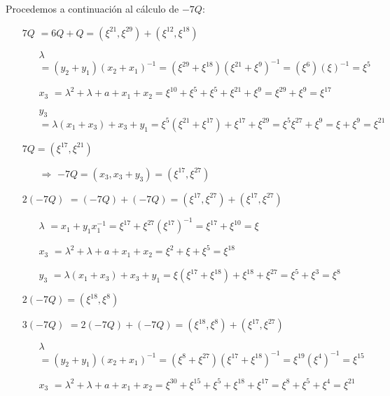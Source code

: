 \documentclass[fleqn]{article}
\begin{document}
    Procedemos a continuación al cálculo de $-7Q$:

    \begin{itemize}
        \item[$7Q$] $ = 6Q + Q = (\xi^{21}, \xi^{29}) + (\xi^{12}, \xi^{18})$
            \begin{itemize}
                \item[$\lambda$] $ = (y_2 + y_1)(x_2 + x_1)^{-1} = (\xi^{29} + \xi^{18})(\xi^{21} + \xi^{9})^{-1} = (\xi^{6})(\xi)^{-1} = \xi^{5}$
                \item[$x_3$] $ = \lambda^2 + \lambda + a + x_1 + x_2 = \xi^{10} + \xi^{5} + \xi^{5} + \xi^{21} + \xi^{9} = \xi^{29} + \xi^{9} = \xi^{17}$
                \item[$y_3$] $ = \lambda(x_1 + x_3) + x_3 + y_1 = \xi^{5} (\xi^{21} + \xi^{17}) + \xi^{17} + \xi^{29} = \xi^{5} \xi^{27} + \xi^{9} = \xi + \xi^{9} = \xi^{21}$
            \end{itemize}
            $7Q = (\xi^{17}, \xi^{21})$
            \begin{itemize}
                \item[$\Rightarrow$] $-7Q = (x_3, x_3 + y_3) = (\xi^{17}, \xi^{27})$
            \end{itemize}
        \item[$2(-7Q)$] $ = (-7Q) + (-7Q) = (\xi^{17}, \xi^{27}) + (\xi^{17}, \xi^{27})$
            \begin{itemize}
                \item[$\lambda$] $ = x_1 + y_1x_1^{-1} = \xi^{17} + \xi^{27} (\xi^{17})^{-1} = \xi^{17} + \xi^{10} = \xi$
                \item[$x_3$] $ = \lambda^2 + \lambda + a + x_1 + x_2 = \xi^{2} + \xi + \xi^{5} = \xi^{18}$
                \item[$y_3$] $ = \lambda(x_1 + x_3) + x_3 + y_1 = \xi (\xi^{17} + \xi^{18}) + \xi^{18} + \xi^{27} = \xi^{5} + \xi^{3} = \xi^{8}$
            \end{itemize}
            $2(-7Q) = (\xi^{18}, \xi^{8})$
        \item[$3(-7Q)$] $ = 2(-7Q) + (-7Q) = (\xi^{18}, \xi^{8}) + (\xi^{17}, \xi^{27})$
            \begin{itemize}
                \item[$\lambda$] $ = (y_2 + y_1)(x_2 + x_1)^{-1} = (\xi^{8} + \xi^{27}) (\xi^{17} + \xi^{18})^{-1} = \xi^{19} (\xi^{4})^{-1} = \xi^{15}$
                \item[$x_3$] $ = \lambda^2 + \lambda + a + x_1 + x_2 = \xi^{30} + \xi^{15} + \xi^{5} + \xi^{18} + \xi^{17} = \xi^{8} + \xi^{5} + \xi^{4} = \xi^{21}$

\end{itemize}
\end{itemize}
\end{document}
